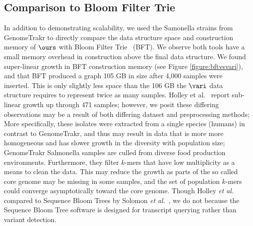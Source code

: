 \subsection{Comparison to Bloom Filter Trie}

In addition to demonstrating scalability, we used the Samonella strains from GenomeTrakr to directly compare the data structure space and construction memory of $\ours$ with Bloom Filter Trie~\cite{holley2015bloom} (BFT).  We observe both tools have a small memory overhead in construction above the final data structure. We found super-linear growth in BFT construction memory (see Figure \ref{figure:bftvsvari}), and that BFT produced a graph 105 GB in size after 4,000 samples were inserted. This is only slightly less space than the 106 GB the $\vari$ data structure requires to represent twice as many samples.  Holley  et al.~\cite{holley2015bloom} report  sub-linear growth up through 471 samples; however, we posit these differing observations may be a result of both differing dataset and preprocessing methods; More specifically, these isolates were extracted from a single species (humans) in contrast to GenomeTrakr, and thus may result in data that is more more homogeneous and has slower growth in the diversity with population size;  GenomeTrakr Salmonella samples are culled from  diverse food production environments.  Furthermore, they filter $k$-mers that have low multiplicity as a means to clean the data. This may reduce the growth as parts of the so called core genome may be missing in some samples, and the set of population $k$-mers could converge asymptotically toward the core genome.  Though Holley {\it et al.} compared to Sequence Bloom Trees by Solomon {\it et al.}~\cite{solomon2015large}, we do not because the Sequence Bloom Tree software is designed for transcript querying rather than variant detection.  %



